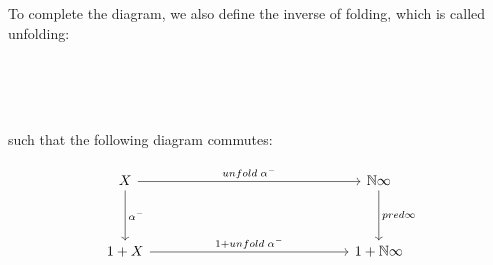 {\begin{code}%
\>[0]\AgdaSpace{}%
\AgdaSpace{}%
\AgdaSymbol{:}\AgdaSpace{}%
\AgdaSpace{}%
\<%
\\
\>[0][@{}l@{\AgdaIndent{0}}]%
\>[2]\<%
\\
%
\>[2]\<%
\\
\>[2][@{}l@{\AgdaIndent{0}}]%
\>[4]\AgdaSpace{}%
\AgdaSymbol{:}\AgdaSpace{}%
\AgdaSpace{}%
\AgdaSpace{}%
\<%
\\
\>[0]\AgdaSpace{}%
\<%
\end{code}

To complete the diagram, we also define the inverse of folding, which is called unfolding:

\begin{code}%
\>[0]\AgdaSpace{}%
\AgdaSymbol{:}\AgdaSpace{}%
\AgdaSymbol{(}\AgdaSpace{}%
\AgdaSpace{}%
\AgdaSpace{}%
\AgdaSpace{}%
\AgdaSymbol{)}\AgdaSpace{}%
\AgdaSpace{}%
\AgdaSpace{}%
\AgdaSpace{}%
\<%
\\
\>[0]\AgdaSpace{}%
\AgdaSymbol{(}\AgdaSpace{}%
\AgdaSpace{}%
\AgdaSymbol{)}\AgdaSpace{}%
\AgdaSpace{}%
\AgdaSpace{}%
\<%
\\
\>[0]\AgdaSpace{}%
\AgdaSymbol{|}\AgdaSpace{}%
\AgdaSpace{}%
\AgdaSpace{}%
\AgdaSymbol{=}\AgdaSpace{}%
\AgdaSpace{}%
\<%
\\
\>[0]\AgdaSpace{}%
\AgdaSymbol{|}\AgdaSpace{}%
\AgdaSpace{}%
\AgdaSpace{}%
\AgdaSymbol{=}\AgdaSpace{}%
\AgdaSpace{}%
\AgdaSymbol{(}\AgdaSpace{}%
\AgdaSpace{}%
\AgdaSymbol{)}\<%
\end{code}

such that the following diagram commutes:

\[
\begin{tikzcd}[row sep=huge, column sep=5.0cm]
X \arrow[r, "unfold\;\alpha^{-}"] \arrow[d, "\alpha^{-}"]
& \mathbb{N}\infty \arrow[d, "pred\infty"] \\
1 + X \arrow[r, "1 + unfold\;\alpha^{-}"]
& 1 + \mathbb{N}\infty
\end{tikzcd}
\]

}
